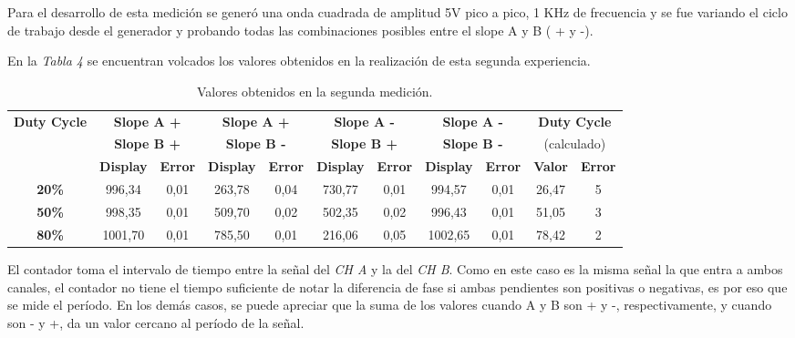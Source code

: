 \documentclass{article}
\begin{document}
	
	Para el desarrollo de esta medición se generó una onda cuadrada de amplitud 5V pico a pico, 1 KHz de frecuencia y se fue variando el ciclo de trabajo desde el generador y probando todas las combinaciones posibles entre el slope A y B ( + y -). 
	\par
	En la \textit{Tabla 4} se encuentran volcados los valores obtenidos en la realización de esta segunda experiencia.
\bigskip\bigskip\medskip


\begin{table}[!hbt]
	\begin{center}

		\begin{tabular}{|c|c|c|c|c|c|c|c|c|c|c|} \hline
			\multirow{3}{*}{\textbf{Duty Cycle}}
			& \multicolumn{2}{c|}{\textbf{Slope A +}} & \multicolumn{2}{c|}{\textbf{Slope A +}} & \multicolumn{2}{c|}{\textbf{Slope A -}} & \multicolumn{2}{c|}{\textbf{Slope A -}} & \multicolumn{2}{c|}{\textbf{Duty Cycle}} \\
			& \multicolumn{2}{c|}{\textbf{Slope B +}} & \multicolumn{2}{c|}{\textbf{Slope B -}} & \multicolumn{2}{c|}{\textbf{Slope B +}} & \multicolumn{2}{c|}{\textbf{Slope B -}} & \multicolumn{2}{c|}{(calculado)} \\\cline{2-11}
			& \textbf{Display} & \textbf{Error} & \textbf{Display} & \textbf{Error} & \textbf{Display} & \textbf{Error} & \textbf{Display} & \textbf{Error} & \textbf{Valor} & \textbf{Error} \\\hline
			
			\textbf{20\%} & 996,34 & 0,01 & 263,78 & 0,04 & 730,77 & 0,01 & 994,57 & 0,01 & 26,47 & 5 \\\hline
			\textbf{50\%} & 998,35 & 0,01 & 509,70 & 0,02 & 502,35 & 0,02 & 996,43 & 0,01 & 51,05 & 3 \\\hline
			\textbf{80\%} & 1001,70 & 0,01 & 785,50 & 0,01 & 216,06 & 0,05 & 1002,65 & 0,01 & 78,42 & 2 \\\hline
		\end{tabular}




	\caption{Valores obtenidos en la segunda medición.}
	\end{center}
\end{table}
\bigskip

	
	El contador toma el intervalo de tiempo entre la señal del \textit{CH A} y la del \textit{CH B}. Como en este caso es la misma señal la que entra a ambos canales, el contador no tiene el tiempo suficiente de notar la diferencia de fase si ambas pendientes son positivas o negativas, es por eso que se mide el período. En los demás casos, se puede apreciar que la suma de los valores cuando A y B son + y -, respectivamente, y cuando son - y +, da un valor cercano al período de la señal.
\bigskip\bigskip
\end{document}
